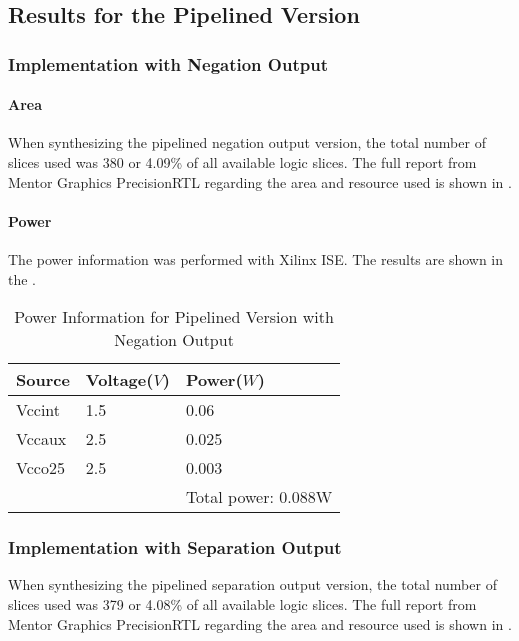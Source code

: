 \subsection{Results for the Pipelined Version}
\subsubsection{Implementation with Negation Output}
\paragraph{Area}
When synthesizing the pipelined negation output version, the total number of slices used was 380 or 4.09\% 
of all available logic slices. The full report from Mentor Graphics PrecisionRTL regarding the area
and resource used is shown in .

\paragraph{Power}
The power information was performed with Xilinx ISE. The results are shown in the .

\begin{table}[!ht]
	\renewcommand{\arraystretch}{1.3}
	\caption{Power Information for Pipelined Version with Negation Output}
	\centering
	\begin{tabular}{ p{4cm} p{4cm} p{4cm} }
		\hline
		\bfseries Source & \bfseries Voltage(\(V\)) & \bfseries Power(\(W\)) \\
		\hline
		Vccint           & 1.5                      & 0.06                   \\
		Vccaux           & 2.5                      & 0.025                  \\
		Vcco25           & 2.5                      & 0.003                  \\
		\hline
		                 &                          & Total power: 0.088W    \\
	\end{tabular}
	\label{tb:p__neg_power}
\end{table}

\subsubsection{Implementation with Separation Output}

When synthesizing the pipelined separation output version, the total number of slices used was 379 or 4.08\% 
of all available logic slices. The full report from Mentor Graphics PrecisionRTL regarding the area
and resource used is shown in .

